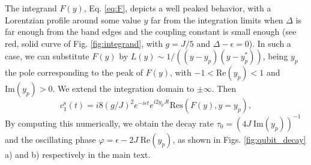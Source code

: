 \documentclass[aps,pra,twocolumn,floatfix,superscriptaddress]{revtex4-1}%
\begin{document}
The integrand $F(y)$, Eq. \eqref{eq:F}, depicts a well peaked behavior, with a Lorentzian profile around some value $y$ far from the integration limits when $\Delta$ is far enough from the band edges and the coupling constant is small enough (see red, solid curve of Fig. \ref{fig:integrand}, with $g=J/5$ and $\Delta-\epsilon=0$). In such a case, we can substitute $F(y)$ by $L(y)\sim 1/((y-y_p)(y-y_p^*))$, being $y_p$ the pole corresponding to the peak of $F(y)$, with $-1<\text{Re}(y_p)<1$ and $\text{Im}(y_p)>0$. We extend the integration domain to $\pm\infty$. Then
\begin{equation}
c_1^\text{s}(t) = i8(g/J)^2 e^{-i\epsilon t}e^{i2y_p Jt}\text{Res}(F(y),y=y_p),
\end{equation}
By computing this numerically, we obtain the decay rate  $\tau_0 = (4J\;\text{Im}(y_p))^{-1}$ and the oscillating phase $\varphi = \epsilon - 2J\;\text{Re}(y_p)$, as shown in Figs. \ref{fig:qubit_decay} a) and b) respectively in the main text.

\end{document}
